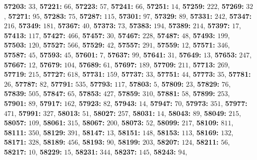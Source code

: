 \textsf{\bfseries 57203:} $33$, \textsf{\bfseries 57221:} $66$, \textsf{\bfseries 57223:} $57$, \textsf{\bfseries 57241:} $66$, \textsf{\bfseries 57251:} $14$, \textsf{\bfseries 57259:} $222$, \textsf{\bfseries 57269:} $32$, \textsf{\bfseries 57271:} $95$, \textsf{\bfseries 57283:} $75$, \textsf{\bfseries 57287:} $115$, \textsf{\bfseries 57301:} $97$, \textsf{\bfseries 57329:} $89$, \textsf{\bfseries 57331:} $242$, \textsf{\bfseries 57347:} $216$, \textsf{\bfseries 57349:} $181$, \textsf{\bfseries 57367:} $40$, \textsf{\bfseries 57373:} $73$, \textsf{\bfseries 57383:} $194$, \textsf{\bfseries 57389:} $214$, \textsf{\bfseries 57397:} $17$, \textsf{\bfseries 57413:} $117$, \textsf{\bfseries 57427:} $466$, \textsf{\bfseries 57457:} $30$, \textsf{\bfseries 57467:} $228$, \textsf{\bfseries 57487:} $48$, \textsf{\bfseries 57493:} $199$, \textsf{\bfseries 57503:} $120$, \textsf{\bfseries 57527:} $566$, \textsf{\bfseries 57529:} $42$, \textsf{\bfseries 57557:} $291$, \textsf{\bfseries 57559:} $12$, \textsf{\bfseries 57571:} $346$, \textsf{\bfseries 57587:} $45$, \textsf{\bfseries 57593:} $45$, \textsf{\bfseries 57601:} $7$, \textsf{\bfseries 57637:} $99$, \textsf{\bfseries 57641:} $31$, \textsf{\bfseries 57649:} $13$, \textsf{\bfseries 57653:} $247$, \textsf{\bfseries 57667:} $12$, \textsf{\bfseries 57679:} $104$, \textsf{\bfseries 57689:} $61$, \textsf{\bfseries 57697:} $189$, \textsf{\bfseries 57709:} $211$, \textsf{\bfseries 57713:} $269$, \textsf{\bfseries 57719:} $215$, \textsf{\bfseries 57727:} $618$, \textsf{\bfseries 57731:} $159$, \textsf{\bfseries 57737:} $33$, \textsf{\bfseries 57751:} $44$, \textsf{\bfseries 57773:} $35$, \textsf{\bfseries 57781:} $26$, \textsf{\bfseries 57787:} $82$, \textsf{\bfseries 57791:} $535$, \textsf{\bfseries 57793:} $117$, \textsf{\bfseries 57803:} $5$, \textsf{\bfseries 57809:} $23$, \textsf{\bfseries 57829:} $76$, \textsf{\bfseries 57839:} $505$, \textsf{\bfseries 57847:} $65$, \textsf{\bfseries 57853:} $427$, \textsf{\bfseries 57859:} $310$, \textsf{\bfseries 57881:} $58$, \textsf{\bfseries 57899:} $253$, \textsf{\bfseries 57901:} $89$, \textsf{\bfseries 57917:} $162$, \textsf{\bfseries 57923:} $82$, \textsf{\bfseries 57943:} $14$, \textsf{\bfseries 57947:} $70$, \textsf{\bfseries 57973:} $351$, \textsf{\bfseries 57977:} $471$, \textsf{\bfseries 57991:} $327$, \textsf{\bfseries 58013:} $51$, \textsf{\bfseries 58027:} $257$, \textsf{\bfseries 58031:} $14$, \textsf{\bfseries 58043:} $89$, \textsf{\bfseries 58049:} $215$, \textsf{\bfseries 58057:} $109$, \textsf{\bfseries 58061:} $315$, \textsf{\bfseries 58067:} $200$, \textsf{\bfseries 58073:} $52$, \textsf{\bfseries 58099:} $217$, \textsf{\bfseries 58109:} $811$, \textsf{\bfseries 58111:} $350$, \textsf{\bfseries 58129:} $391$, \textsf{\bfseries 58147:} $13$, \textsf{\bfseries 58151:} $148$, \textsf{\bfseries 58153:} $113$, \textsf{\bfseries 58169:} $132$, \textsf{\bfseries 58171:} $328$, \textsf{\bfseries 58189:} $456$, \textsf{\bfseries 58193:} $90$, \textsf{\bfseries 58199:} $203$, \textsf{\bfseries 58207:} $124$, \textsf{\bfseries 58211:} $56$, \textsf{\bfseries 58217:} $10$, \textsf{\bfseries 58229:} $15$, \textsf{\bfseries 58231:} $344$, \textsf{\bfseries 58237:} $145$, \textsf{\bfseries 58243:} $94$, 
